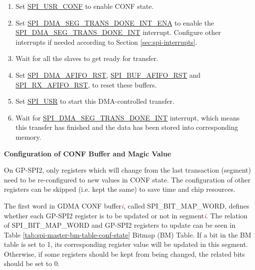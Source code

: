 \documentclass[main\_\_EN.tex]{subfiles}
\begin{document}
\begin{enumerate}
   \item Set \hyperref[fielddesc:SPIUSRCONF]{SPI\_USR\_CONF} to enable CONF state.
   \item Set \hyperref[fielddesc:SPIDMASEGTRANSDONEINTENA]{SPI\_DMA\_SEG\_TRANS\_DONE\_INT\_ENA} to enable the \hyperref[int:SPIDMASEGTRANSDONEINT]{SPI\_DMA\_SEG\_TRANS\_DONE\_INT} interrupt. Configure other interrupts if needed according to Section \ref{sec:spi-interrupts}.

   \item Wait for all the slaves to get ready for transfer.

    \item Set \hyperref[fielddesc:SPIDMAAFIFORST]{SPI\_DMA\_AFIFO\_RST}, \hyperref[fielddesc:SPIBUFAFIFORST]{SPI\_BUF\_AFIFO\_RST} and \hyperref[fielddesc:SPIRXAFIFORST]{SPI\_RX\_AFIFO\_RST}, to reset these buffers.

   \item Set \hyperref[fielddesc:SPIUSR]{SPI\_USR} to start this DMA-controlled transfer.

   \item Wait for \hyperref[int:SPIDMASEGTRANSDONEINT]{SPI\_DMA\_SEG\_TRANS\_DONE\_INT} interrupt, which means this transfer has finished and the data has been stored into corresponding memory.
 \end{enumerate}

\textbf{Configuration of CONF Buffer and Magic Value}\label{other:spi-para-config-conf-buffer-magic-value}

On GP-SPI2, only registers which will change from the last transaction (segment) need to be re-configured to new values in CONF state. The configuration of other registers can be skipped (i.e. kept the same) to save time and chip resources.

The first word in GDMA CONF buffer\textcolor{red}{\it i}, called SPI\_BIT\_MAP\_WORD, defines whether each GP-SPI2 register is to be updated or not in segment\textcolor{red}{\it i}. The relation of SPI\_BIT\_MAP\_WORD and GP-SPI2 registers to update can be seen in Table \ref{tab:spi-master-bm-table-conf-state} Bitmap (BM) Table. If a bit in the BM table is set to 1, its corresponding register value will be updated in this segment. Otherwise, if some registers should be kept from being changed, the related bits should be set to 0.
\end{document}
